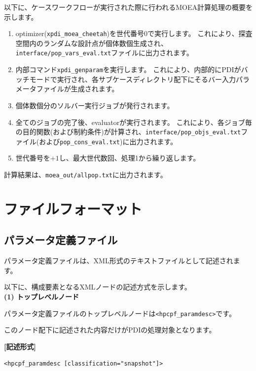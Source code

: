 \documentclass[a4paper,11pt]{jarticle}
\begin{document}
{以下に、ケースワークフローが実行された際に行われるMOEA計算処理の概要を示します。

\begin{enumerate}
\item optimizer({\tt xpdi\_moea\_cheetah})を世代番号0で実行します。
これにより、探査空間内のランダムな設計点が個体数個生成され、{\tt interface/pop\_vars\_eval.txt}ファイルに出力されます。

\item 内部コマンド{\tt xpdi\_genparam}を実行します。
これにより、内部的にPDIがバッチモードで実行され、各サブケースディレクトリ配下にそるバー入力パラメータファイルが生成されます。

\item 個体数個分のソルバー実行ジョブが発行されます。

\item 全てのジョブの完了後、evaluatorが実行されます。
これにより、各ジョブ毎の目的関数(および制約条件)が計算され、{\tt interface/pop\_objs\_eval.txt}ファイル(および{\tt pop\_cons\_eval.txt})に出力されます。

\item 世代番号を$+1$し、最大世代数回、処理1から繰り返します。
\end{enumerate}

計算結果は、{\tt moea\_out/allpop.txt}に出力されます。


\newpage
\section{ファイルフォーマット}

\subsection{パラメータ定義ファイル}

パラメータ定義ファイルは、XML形式のテキストファイルとして記述されます。

以下に、構成要素となるXMLノードの記述方式を示します。\\

\textbf{(1) トップレベルノード}

パラメータ定義ファイルのトップレベルノードは\texttt{<hpcpf\_paramdesc>}です。

このノード配下に記述された内容だけがPDIの処理対象となります。

\vspace{8pt}
\leftskip=12pt
\textbf{[記述形式]}

\leftskip=42pt
\texttt{<hpcpf\_paramdesc  [classification="snapshot"]>} 
   
}
\end{document}
